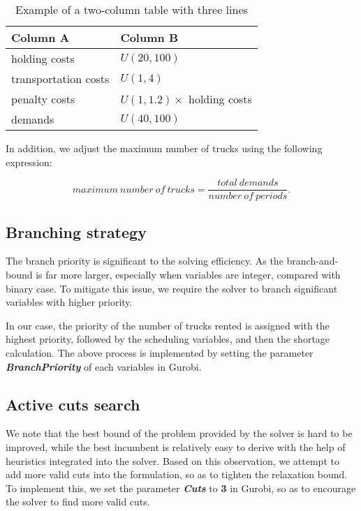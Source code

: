 \documentclass[a4paper,12pt]{article}
\begin{document}
\begin{table}[htbp]
    \centering
    \caption{Example of a two-column table with three lines}
    \label{tab:example}
    \begin{tabular}{ll}  %
        \toprule
        Column A & Column B \\
        \midrule
        holding costs   & $U(20, 100)$  \\
        transportation costs   & $U(1, 4)$  \\
        penalty costs   & $U(1, 1.2) \times$ holding costs  \\
        demands         & $U(40, 100)$ \\
        \bottomrule
    \end{tabular}
\end{table}

In addition, we adjust the maximum number of trucks using the following expression:

$$
maximum \ number \ of \ trucks = \frac{total \ demands}{number \ of \  periods}.
$$

\subsection{Branching strategy}
The branch priority is significant to the solving efficiency. As the branch-and-bound is far more larger, especially when variables are integer, compared with binary case. To mitigate this issue, we require the solver to branch significant variables with higher priority. 

In our case, the priority of the number of trucks rented is assigned with the highest priority, followed by the scheduling variables, and then the shortage calculation. The above process is implemented by setting the parameter \textbf{\textit{BranchPriority}} of each variables in Gurobi.

\subsection{Active cuts search}
We note that the best bound of the problem provided by the solver 
is hard to be improved, while the best incumbent is relatively easy to derive with the help of heuristics integrated into the solver. Based on this observation, we attempt to add more valid cuts into the formulation, so as to tighten the relaxation bound. To implement this, we set the parameter \textbf{\textit{Cuts}} to \textbf{3} in Gurobi, so as to encourage the solver to find more valid cuts.
\end{document}
